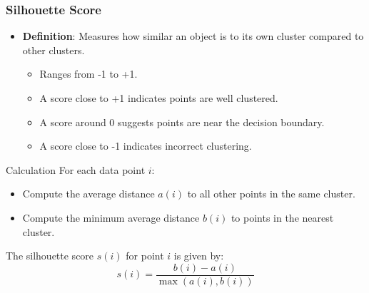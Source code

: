 \documentclass[aspectratio=169]{beamer}
\begin{document}
\begin{frame}[fragile]
    \frametitle{Silhouette Score}
    \begin{itemize}
        \item \textbf{Definition}: Measures how similar an object is to its own cluster compared to other clusters.
        \begin{itemize}
            \item Ranges from -1 to +1.
            \item A score close to +1 indicates points are well clustered.
            \item A score around 0 suggests points are near the decision boundary.
            \item A score close to -1 indicates incorrect clustering.
        \end{itemize}
    \end{itemize}
    
    \begin{block}{Calculation}
        For each data point \( i \):
        \begin{itemize}
            \item Compute the average distance \( a(i) \) to all other points in the same cluster.
            \item Compute the minimum average distance \( b(i) \) to points in the nearest cluster.
        \end{itemize}
        
        The silhouette score \( s(i) \) for point \( i \) is given by:
        \begin{equation}
            s(i) = \frac{b(i) - a(i)}{\max(a(i), b(i))}
        \end{equation}
    \end{block}
\end{frame}
\end{document}
